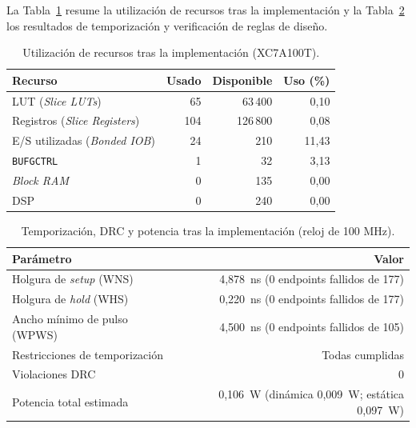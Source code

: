 \documentclass[letterpaper,12pt]{article}
\begin{document}
La Tabla~\ref{tab:recursos} resume la utilización de recursos tras la implementación y la Tabla~\ref{tab:timing} los resultados de temporización y verificación de reglas de diseño.

\begin{table}[H]
\centering
\caption{Utilización de recursos tras la implementación (XC7A100T).}
\label{tab:recursos}
\small
\begin{tabular}{|l|r|r|r|}
\hline
\textbf{Recurso} & \textbf{Usado} & \textbf{Disponible} & \textbf{Uso (\%)} \\ \hline
LUT (\emph{Slice LUTs})         & 65  & 63\,400  & 0,10 \\ \hline
Registros (\emph{Slice Registers}) & 104 & 126\,800 & 0,08 \\ \hline
E/S utilizadas (\emph{Bonded IOB}) & 24  & 210      & 11,43 \\ \hline
\texttt{BUFGCTRL}               & 1   & 32       & 3,13 \\ \hline
\emph{Block RAM}                & 0   & 135      & 0,00 \\ \hline
DSP                             & 0   & 240      & 0,00 \\ \hline
\end{tabular}
\end{table}

\begin{table}[H]
\centering
\caption{Temporización, DRC y potencia tras la implementación (reloj de 100 MHz).}
\label{tab:timing}
\small
\begin{tabularx}{\textwidth}{|X|r|}
\hline
\textbf{Parámetro} & \textbf{Valor} \\ \hline
Holgura de \emph{setup} (WNS)                        & 4,878~ns (0 endpoints fallidos de 177) \\ \hline
Holgura de \emph{hold} (WHS)                         & 0,220~ns (0 endpoints fallidos de 177) \\ \hline
Ancho mínimo de pulso (WPWS)                         & 4,500~ns (0 endpoints fallidos de 105) \\ \hline
Restricciones de temporización                       & Todas cumplidas \\ \hline
Violaciones DRC                                      & 0 \\ \hline
Potencia total estimada                              & 0,106~W (dinámica 0,009~W; estática 0,097~W) \\ \hline
\end{tabularx}
\end{table}
\end{document}
